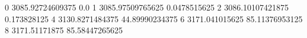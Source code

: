 0 3085.92724609375 0.0
1 3085.97509765625 0.0478515625
2 3086.10107421875 0.173828125
4 3130.8271484375 44.89990234375
6 3171.041015625 85.11376953125
8 3171.51171875 85.58447265625
